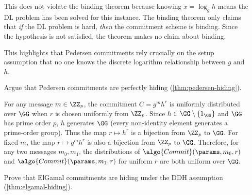 \ifsolutions
\begin{mysolution}
  This does not violate the binding theorem because knowing $x = \log_g h$ means the DL problem has been solved for this instance.
  The binding theorem only claims that \emph{if} the DL problem is hard, \emph{then} the commitment scheme is binding.
  Since the hypothesis is not satisfied, the theorem makes no claim about binding.
  
  This highlights that Pedersen commitments rely crucially on the setup assumption that no one knows the discrete logarithm relationship between $g$ and $h$.
\end{mysolution}
\fi

\begin{exercise}\label{ex:pedersen-hiding}
  Argue that Pedersen commitments are perfectly hiding (\autoref{thm:pedersen-hiding}).
\end{exercise}

\ifsolutions
\begin{mysolution}
  For any message $m \in \ZZ_p$, the commitment $C = g^m h^r$ is uniformly distributed over $\GG$ when $r$ is chosen uniformly from $\ZZ_p$.
  Since $h \in \GG \setminus \{1_\GG\}$ and $\GG$ has prime order $p$, $h$ generates $\GG$ (every non-identity element generates a prime-order group).
  Thus the map $r \mapsto h^r$ is a bijection from $\ZZ_p$ to $\GG$.
  For fixed $m$, the map $r \mapsto g^m h^r$ is also a bijection from $\ZZ_p$ to $\GG$.
  Therefore, for any two messages $m_0, m_1$, the distributions of $\algo{Commit}(\params, m_0, r)$ and $\algo{Commit}(\params, m_1, r)$ for uniform $r$ are both uniform over $\GG$.
\end{mysolution}
\fi

\begin{exercise}[Optional]\label{ex:elgamal-hiding}
  Prove that ElGamal commitments are hiding under the DDH assumption (\autoref{thm:elgamal-hiding}).
\end{exercise}

